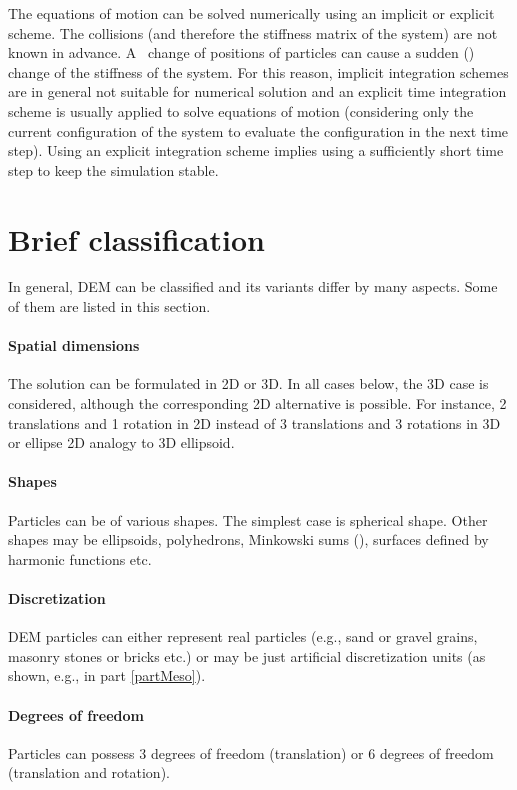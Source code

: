 The equations of motion can be solved numerically using an implicit or explicit scheme.
The collisions (and therefore the stiffness matrix of the system) are not known in advance.
A~ change of positions of particles can cause a sudden () change of the stiffness of the system.
For this reason, implicit integration schemes are in general not suitable for numerical solution
and an explicit time integration scheme is usually applied to solve equations of motion (considering only the current configuration of the system to evaluate the configuration in the next time step).
Using an explicit integration scheme implies using a sufficiently short time step to keep the simulation stable.


\section{Brief classification}
In general, DEM can be classified and its variants differ by many aspects.
Some of them are listed in this section.

\paragraph{Spatial dimensions}
The solution can be formulated in 2D or 3D.
In all cases below, the 3D case is considered, although the corresponding 2D alternative is possible.
For instance, 2 translations and 1 rotation in 2D instead of 3 translations and 3 rotations in 3D or ellipse 2D analogy to 3D ellipsoid.

\paragraph{Shapes}
Particles can be of various shapes.
The simplest case is spherical shape.
Other shapes may be
ellipsoids,
polyhedrons,
Minkowski sums (),
surfaces defined by harmonic functions
etc.

\paragraph{Discretization}
DEM particles can either represent real particles (e.g., sand or gravel grains, masonry stones or bricks etc.) or may be just artificial discretization units (as shown, e.g., in part \ref{partMeso}).

\paragraph{Degrees of freedom}
Particles can possess 3 degrees of freedom (translation) or 6 degrees of freedom (translation and rotation).


